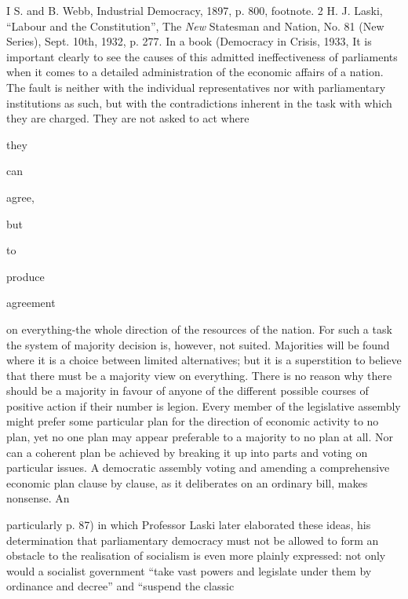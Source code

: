 \documentclass[11pt,openany]{book}
\begin{document}
\begin{center}\textasteriskcentered\hspace{0.9em}\textasteriskcentered\hspace{0.9em}\textasteriskcentered\end{center}

\begin{center}\textasteriskcentered\hspace{0.9em}\textasteriskcentered\hspace{0.9em}\textasteriskcentered\end{center}

I S. and B. Webb, Industrial Democracy, 1897, p. 800, footnote. 2 H. J. Laski, ``Labour and the Constitution'', The \emph{New} Statesman and Nation, No. 81 (New Series), Sept. 10th, 1932, p. 277. In a book (Democracy in Crisis, 1933, It is important clearly to see the causes of this admitted ineffectiveness of parliaments when it comes to a detailed administration of the economic affairs of a nation. The fault is neither with the individual representatives nor with parliamentary institutions as such, but with the contradictions inherent in the task with which they are charged. They are not asked to act where

they

can

agree,

but

to

produce

agreement

on everything-the whole direction of the resources of the nation. For such a task the system of majority decision is, however, not suited. Majorities will be found where it is a choice between limited alternatives; but it is a superstition to believe that there must be a majority view on everything. There is no reason why there should be a majority in favour of anyone of the different possible courses of positive action if their number is legion. Every member of the legislative assembly might prefer some particular plan for the direction of economic activity to no plan, yet no one plan may appear preferable to a majority to no plan at all. Nor can a coherent plan be achieved by breaking it up into parts and voting on particular issues. A democratic assembly voting and amending a comprehensive economic plan clause by clause, as it deliberates on an ordinary bill, makes nonsense. An

particularly p. 87) in which Professor Laski later elaborated these ideas, his determination that parliamentary democracy must not be allowed to form an obstacle to the realisation of socialism is even more plainly expressed: not only would a socialist government ``take vast powers and legislate under them by ordinance and decree'' and ``suspend the classic
\end{document}
